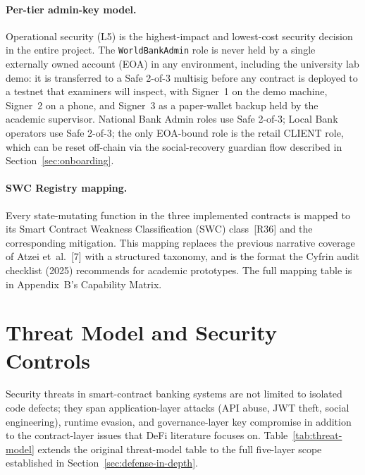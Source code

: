 \documentclass[12pt,a4paper]{report}
\begin{document}
\paragraph{Per-tier admin-key model.}
Operational security (L5) is the highest-impact and lowest-cost security decision in the entire project. The \texttt{WorldBankAdmin} role is never held by a single externally owned account (EOA) in any environment, including the university lab demo: it is transferred to a Safe 2-of-3 multisig before any contract is deployed to a testnet that examiners will inspect, with Signer~1 on the demo machine, Signer~2 on a phone, and Signer~3 as a paper-wallet backup held by the academic supervisor. National Bank Admin roles use Safe 2-of-3; Local Bank operators use Safe 2-of-3; the only EOA-bound role is the retail CLIENT role, which can be reset off-chain via the social-recovery guardian flow described in Section~\ref{sec:onboarding}.

\paragraph{SWC Registry mapping.}
Every state-mutating function in the three implemented contracts is mapped to its Smart Contract Weakness Classification (SWC) class~[R36] and the corresponding mitigation. This mapping replaces the previous narrative coverage of Atzei et~al.~[7] with a structured taxonomy, and is the format the Cyfrin audit checklist (2025) recommends for academic prototypes. The full mapping table is in Appendix~B's Capability Matrix.

\section{Threat Model and Security Controls}
\label{sec:threat-model}

Security threats in smart-contract banking systems are not limited to isolated code defects; they span application-layer attacks (API abuse, JWT theft, social engineering), runtime evasion, and governance-layer key compromise in addition to the contract-layer issues that DeFi literature focuses on. Table~\ref{tab:threat-model} extends the original threat-model table to the full five-layer scope established in Section~\ref{sec:defense-in-depth}.
\end{document}
